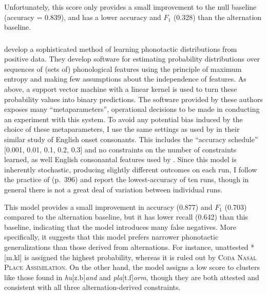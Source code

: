 Unfortunately, this score only provides a small improvement to the null baseline
 (accuracy = 0.839), and has a lower accuracy and $F_1$ (0.328) than the alternation baseline. 

\subsubsection{\citet{Hayes2008a}}

\citeauthor{Hayes2008a} develop a sophisticated method of learning phonotactic distributions from positive data. They develop software for estimating probability distributions over sequences of (sets of) phonological features using the principle of maximum entropy and making few assumptions about the independence of features. As above, a support vector machine with a linear kernel is used to turn these probability values into binary predictions. The software provided by these authors exposes many ``metaparameters'', operational decisions to be made in conducting an experiment with this system. To avoid any potential bias induced by the choice of these metaparameters, I use the same settings as used by \citet{Hayes2008a} in their similar study of English onset consonants. This includes the ``accuracy schedule'' [0.001, 0.01, 0.1, 0.2, 0.3] and no constraints on the number of constraints learned, as well English consonantal features used by \citeauthor{Hayes2008a}. Since this model is inherently stochastic, producing slightly different outcomes on each run, I follow the practice of \citeauthor{Hayes2008a} (p.~396) and report the lowest-accuracy of ten runs, though in general there is not a great deal of variation between individual runs.  

This model provides a small improvement in accuracy (0.877) and $F_1$ (0.703) compared to the alternation baseline, but it has lower recall (0.642) than this baseline, indicating that the \citeauthor{Hayes2008a} model introduces many false negatives. 
More specifically, it suggests that this model prefers narrower phonotactic generalizations than those derived from alternations. For instance, unattested *[m.kl] is assigned the highest probability, whereas it is ruled out by \textsc{Coda Nasal Place Assimilation}. On the other hand, the \citeauthor{Hayes2008a} model assigns a low score to clusters like those found in \emph{hu}[z.b]\emph{and} and \emph{pla}[t.f]\emph{orm}, though they are both attested and consistent with all three alternation-derived constraints. 

